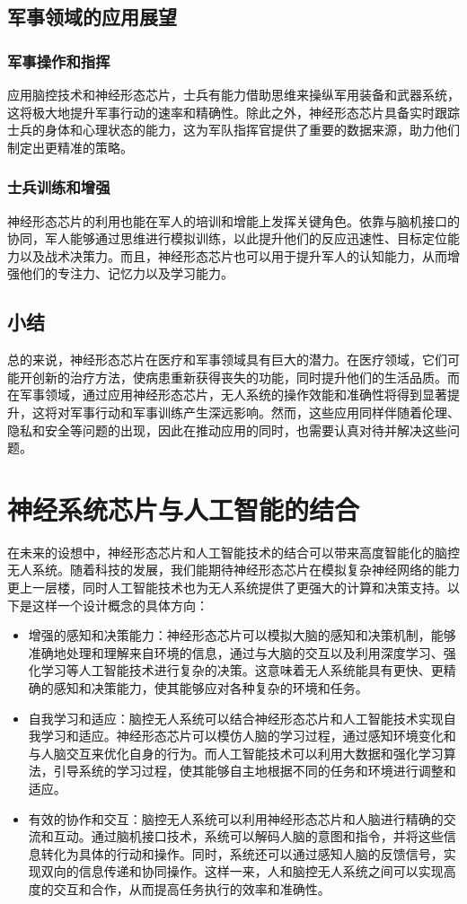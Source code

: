 \documentclass{thuemp}
\begin{document}
\subsection{军事领域的应用展望}
\subsubsection{军事操作和指挥}
应用脑控技术和神经形态芯片，士兵有能力借助思维来操纵军用装备和武器系统，这将极大地提升军事行动的速率和精确性。除此之外，神经形态芯片具备实时跟踪士兵的身体和心理状态的能力，这为军队指挥官提供了重要的数据来源，助力他们制定出更精准的策略。

\subsubsection{士兵训练和增强}
神经形态芯片的利用也能在军人的培训和增能上发挥关键角色。依靠与脑机接口的协同，军人能够通过思维进行模拟训练，以此提升他们的反应迅速性、目标定位能力以及战术决策力。而且，神经形态芯片也可以用于提升军人的认知能力，从而增强他们的专注力、记忆力以及学习能力。

\subsection{小结}
总的来说，神经形态芯片在医疗和军事领域具有巨大的潜力。在医疗领域，它们可能开创新的治疗方法，使病患重新获得丧失的功能，同时提升他们的生活品质。而在军事领域，通过应用神经形态芯片，无人系统的操作效能和准确性将得到显著提升，这将对军事行动和军事训练产生深远影响。然而，这些应用同样伴随着伦理、隐私和安全等问题的出现，因此在推动应用的同时，也需要认真对待并解决这些问题。

\section{神经系统芯片与人工智能的结合}
在未来的设想中，神经形态芯片和人工智能技术的结合可以带来高度智能化的脑控无人系统。随着科技的发展，我们能期待神经形态芯片在模拟复杂神经网络的能力更上一层楼，同时人工智能技术也为无人系统提供了更强大的计算和决策支持。以下是这样一个设计概念的具体方向：

\begin{itemize}
	\item 增强的感知和决策能力：神经形态芯片可以模拟大脑的感知和决策机制，能够准确地处理和理解来自环境的信息，通过与大脑的交互以及利用深度学习、强化学习等人工智能技术进行复杂的决策。这意味着无人系统能具有更快、更精确的感知和决策能力，使其能够应对各种复杂的环境和任务。
	\item 自我学习和适应：脑控无人系统可以结合神经形态芯片和人工智能技术实现自我学习和适应。神经形态芯片可以模仿人脑的学习过程，通过感知环境变化和与人脑交互来优化自身的行为。而人工智能技术可以利用大数据和强化学习算法，引导系统的学习过程，使其能够自主地根据不同的任务和环境进行调整和适应。
	\item 有效的协作和交互：脑控无人系统可以利用神经形态芯片和人脑进行精确的交流和互动。通过脑机接口技术，系统可以解码人脑的意图和指令，并将这些信息转化为具体的行动和操作。同时，系统还可以通过感知人脑的反馈信号，实现双向的信息传递和协同操作。这样一来，人和脑控无人系统之间可以实现高度的交互和合作，从而提高任务执行的效率和准确性。
\end{itemize}
\end{document}

